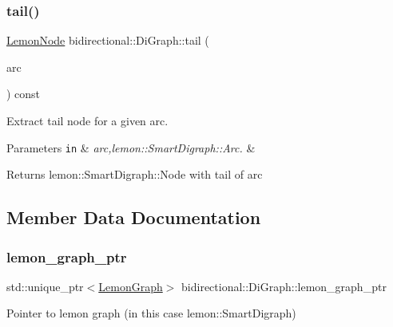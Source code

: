 \subsubsection{\texorpdfstring{tail()}{tail()}}
{\footnotesize\ttfamily \hyperlink{digraph_8h_a9e28ff6f29770c88642a42cab9f42fed}{Lemon\+Node} bidirectional\+::\+Di\+Graph\+::tail (\begin{DoxyParamCaption}\item[{const \hyperlink{digraph_8h_ae6cfd87753a14ebe6d11871314aff34d}{Lemon\+Arc} \&}]{arc }\end{DoxyParamCaption}) const\hspace{0.3cm}{\ttfamily [inline]}}

Extract tail node for a given arc.


\begin{DoxyParams}[1]{Parameters}
\mbox{\tt in}  & {\em arc,lemon\+::\+Smart\+Digraph\+::\+Arc.} & \\
\hline
\end{DoxyParams}
\begin{DoxyReturn}{Returns}
lemon\+::\+Smart\+Digraph\+::\+Node with tail of arc 
\end{DoxyReturn}


\subsection{Member Data Documentation}
\mbox{\label{classbidirectional_1_1DiGraph_a8acd5e0889d880b5b98d1c67a356c4e2}} 
\subsubsection{\texorpdfstring{lemon\+\_\+graph\+\_\+ptr}{lemon\_graph\_ptr}}
{\footnotesize\ttfamily std\+::unique\+\_\+ptr$<$\hyperlink{digraph_8h_a537ef8dbf2625a2629b10f4121e6db2b}{Lemon\+Graph}$>$ bidirectional\+::\+Di\+Graph\+::lemon\+\_\+graph\+\_\+ptr}



Pointer to lemon graph (in this case lemon\+::\+Smart\+Digraph) 

\mbox{\label{classbidirectional_1_1DiGraph_a8c53e94a9b9e41a50e0f3ecf348d1b87}} 
